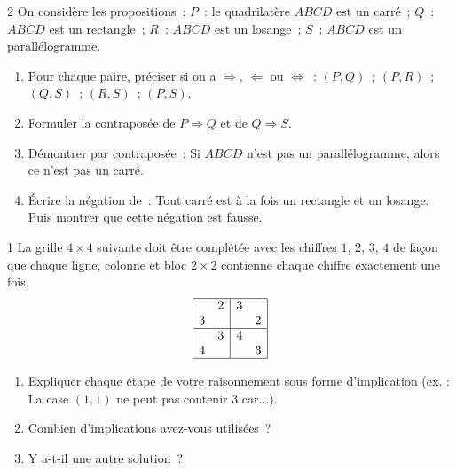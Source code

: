 \begin{probleme}{2}
On consid\`ere les propositions~:
$P$~: \og le quadrilat\`ere $ABCD$ est un carr\'e\fg~;
$Q$~: \og $ABCD$ est un rectangle\fg~;
$R$~: \og $ABCD$ est un losange\fg~;
$S$~: \og $ABCD$ est un parall\'elogramme\fg.
\begin{enumerate}
  \item Pour chaque paire, pr\'eciser si on a $\Rightarrow$, $\Leftarrow$
        ou $\Leftrightarrow$~: $(P,Q)$~; $(P,R)$~; $(Q,S)$~; $(R,S)$~; $(P,S)$.
  \item Formuler la contrapos\'ee de \og\(P \Rightarrow Q\)\fg{}
        et de \og\(Q \Rightarrow S\)\fg{}.
  \item D\'emontrer par contrapos\'ee~:
        \og Si $ABCD$ n'est pas un parall\'elogramme, alors ce n'est pas un carr\'e.\fg
  \item \'Ecrire la n\'egation de~:
        \og Tout carr\'e est \`a la fois un rectangle et un losange.\fg{}
        Puis montrer que cette n\'egation est fausse.
\end{enumerate}
\end{probleme}

\begin{probleme}{1}
La grille $4\times 4$ suivante doit \^etre compl\'et\'ee avec les chiffres $1$, $2$, $3$, $4$
de fa\c con que chaque ligne, colonne et bloc $2\times 2$ contienne chaque chiffre exactement une fois.
\[
\begin{array}{|cc|cc|}
\hline
  & 2 & 3 &   \\
3 &   &   & 2 \\
\hline
  & 3 & 4 &   \\
4 &   &   & 3 \\
\hline
\end{array}
\]
\begin{enumerate}
  \item Expliquer chaque \'etape de votre raisonnement sous forme d'implication
        (ex. : \og La case $(1,1)$ ne peut pas contenir $3$ car...\fg).
  \item Combien d'implications avez-vous utilis\'ees~?
  \item Y a-t-il une autre solution~?
\end{enumerate}
\end{probleme}

